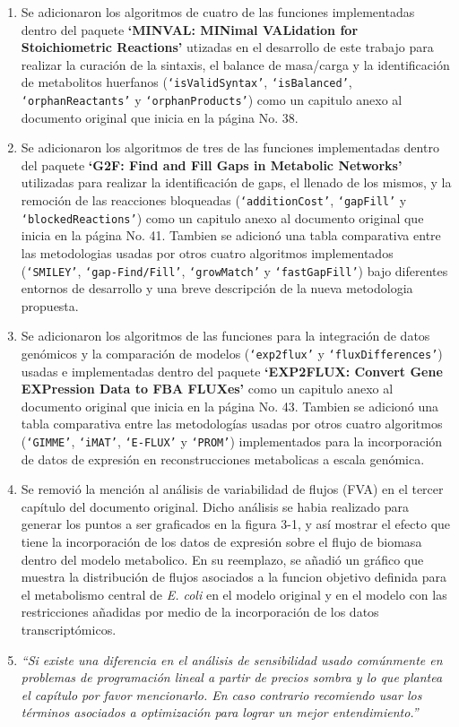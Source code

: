 \documentclass[12pt,a4paper]{article}
\begin{document}
\begin{enumerate}
\item Se adicionaron los algoritmos de cuatro de las  funciones implementadas dentro del paquete \textbf{`MINVAL: MINimal VALidation for Stoichiometric Reactions'} utizadas en el desarrollo de este trabajo para realizar la curación de la sintaxis, el balance de masa/carga y  la identificación de metabolitos huerfanos (\texttt{`isValidSyntax'}, \texttt{`isBalanced'}, \texttt{`orphanReactants'} y \texttt{`orphanProducts'}) como un capitulo anexo al documento original que inicia en la página No. 38.

\item Se adicionaron los algoritmos de tres de las funciones implementadas dentro del paquete \textbf{`G2F: Find and Fill Gaps in Metabolic Networks'} utilizadas para realizar la identificación de gaps, el llenado de los mismos, y la remoción de las reacciones bloqueadas (\texttt{`additionCost'}, \texttt{`gapFill'} y \texttt{`blockedReactions'}) como un capitulo anexo al documento original que inicia en la página No. 41. Tambien se adicionó una tabla comparativa entre las metodologias usadas por otros cuatro algoritmos implementados (\texttt{`SMILEY'}, \texttt{`gap-Find/Fill'}, \texttt{`growMatch'} y \texttt{`fastGapFill'}) bajo diferentes entornos de desarrollo y una breve descripción de la nueva metodologia propuesta.

\item Se adicionaron los algoritmos de las funciones para la integración de datos genómicos y la comparación de modelos  (\texttt{`exp2flux'} y \texttt{`fluxDifferences'}) usadas e implementadas dentro del paquete \textbf{`EXP2FLUX: Convert Gene EXPression Data to FBA FLUXes'} como un capitulo anexo al documento original que inicia en la página No. 43. Tambien se adicionó una tabla comparativa entre las metodologías usadas por otros cuatro algoritmos (\texttt{`GIMME'}, \texttt{`iMAT'}, \texttt{`E-FLUX'} y \texttt{`PROM'}) implementados para la incorporación de datos de expresión en reconstrucciones metabolicas a escala genómica.

\item Se removió la mención al análisis de variabilidad de flujos (FVA) en el tercer capítulo del documento original. Dicho análisis se habia realizado para generar los puntos a ser graficados en la figura 3-1, y así mostrar el efecto que tiene la incorporación de los datos de expresión sobre el flujo de biomasa dentro del modelo metabolico. En su reemplazo, se añadió un gráfico que muestra la distribución de flujos asociados a la funcion objetivo definida para el metabolismo central de \textit{E. coli} en el modelo original y en el modelo con las restricciones añadidas por medio de la incorporación de los datos transcriptómicos.

\item \emph{``Si existe una diferencia en el análisis de sensibilidad usado comúnmente en problemas de programación lineal a partir de precios sombra y lo que plantea el capítulo por favor mencionarlo. En caso contrario recomiendo usar los términos asociados a optimización para lograr un mejor entendimiento.''}

\end{enumerate}
\end{document}
